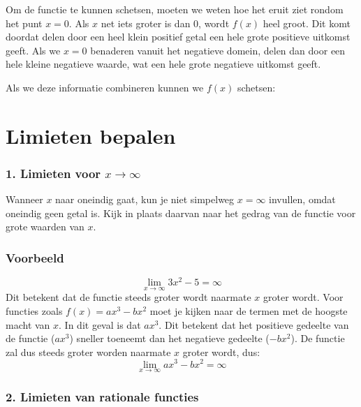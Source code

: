 \documentclass[
  a4paper,
]{scrbook}
\theoremstyle{definition}
\theoremstyle{remark}
\begin{document}
Om de functie te kunnen schetsen, moeten we weten hoe het eruit ziet
rondom het punt \(x=0\). Als \(x\) net iets groter is dan 0, wordt
\(f(x)\) heel groot. Dit komt doordat delen door een heel klein positief
getal een hele grote positieve uitkomst geeft. Als we \(x=0\) benaderen
vanuit het negatieve domein, delen dan door een hele kleine negatieve
waarde, wat een hele grote negatieve uitkomst geeft.

Als we deze informatie combineren kunnen we \(f(x)\) schetsen:

\hypertarget{limieten-bepalen}{%
\section{Limieten bepalen}\label{limieten-bepalen}}

\hypertarget{limieten-voor-xto-infty}{%
\subsubsection*{\texorpdfstring{1. Limieten voor
\(x\to \infty\)}{1. Limieten voor x\textbackslash to \textbackslash infty}}\label{limieten-voor-xto-infty}}

Wanneer \(x\) naar oneindig gaat, kun je niet simpelweg \(x= \infty\)
invullen, omdat oneindig geen getal is. Kijk in plaats daarvan naar het
gedrag van de functie voor grote waarden van \(x\).

\hypertarget{voorbeeld-2}{%
\subsubsection*{Voorbeeld}\label{voorbeeld-2}}

\[ \lim_{x \to \infty} 3 x^2 -5 = \infty\] Dit betekent dat de functie
steeds groter wordt naarmate \(x\) groter wordt. \textbar{} Voor
functies zoals \(f(x)=ax^3-bx^2\) moet je kijken naar de termen met de
hoogste macht van \(x\). In dit geval is dat \(ax^3\). Dit betekent dat
het positieve gedeelte van de functie (\(ax^3\)) sneller toeneemt dan
het negatieve gedeelte (\(-bx^2\)). De functie zal dus steeds groter
worden naarmate \(x\) groter wordt, dus:
\[ \lim_{x \to \infty} ax^3 - bx^2= \infty\]

\hypertarget{limieten-van-rationale-functies}{%
\subsubsection*{2. Limieten van rationale
functies}\label{limieten-van-rationale-functies}}
\end{document}
